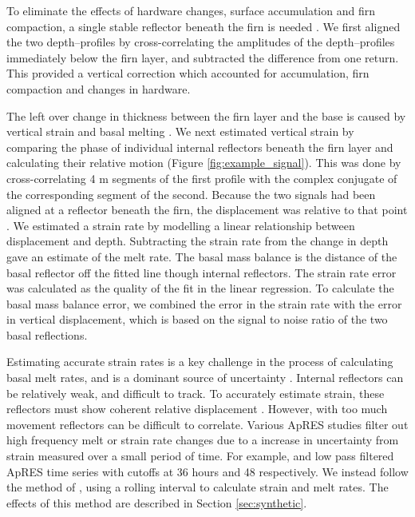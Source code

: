 To eliminate the effects of hardware changes, surface accumulation and firn compaction, a single stable reflector beneath the firn is needed \cite{jenkins2006interactions}. 
We first aligned the two depth--profiles by cross-correlating the amplitudes of the depth--profiles immediately below the firn layer, and subtracted the difference from one return. This provided a vertical correction which accounted for accumulation, firn compaction and changes in hardware. 
 
The left over change in thickness between the firn layer and the base is caused by vertical strain and basal melting \citep{nicholls2015ground}. 
We next estimated vertical strain by comparing the phase of individual internal reflectors beneath the firn layer and calculating their relative motion (Figure \ref{fig:example_signal}). This was done by cross-correlating 4 m segments of the first profile with the complex conjugate of the corresponding segment of the second. Because the two signals had been aligned at a reflector beneath the firn, the displacement was relative to that point  \citep{nicholls2015ground}. We estimated a strain rate by modelling a linear relationship between displacement and depth. Subtracting the strain rate from the change in depth gave an estimate of the melt rate. 
The basal mass balance is the distance of the basal reflector off the fitted line though internal reflectors.
The strain rate error was calculated as the quality of the fit in the linear regression.  
To calculate the basal mass balance error, we combined the error in the strain rate with the error in vertical displacement, which is based on the signal to noise ratio of the two basal reflections.

Estimating accurate strain rates is a key challenge in the process of calculating basal melt rates, and is a dominant source of uncertainty  \citep{vavnkova2020observations}. Internal reflectors can be relatively weak, and difficult to track. To accurately estimate strain, these reflectors must show coherent relative displacement \cite{lindback2019spatial}. However, with too much movement reflectors can be difficult to correlate.  Various ApRES studies filter out high frequency melt or strain rate changes due to a increase in uncertainty from strain measured over a small period of time. For example, \cite{lindback2019spatial} and \cite{davis2018variability} low pass filtered ApRES time series with cutoffs at 36 hours and 48 respectively. We instead follow the method of \cite{sun2019topographic}, using a rolling interval to calculate strain and melt rates.  The effects of this method are described in Section \ref{sec:synthetic}.

